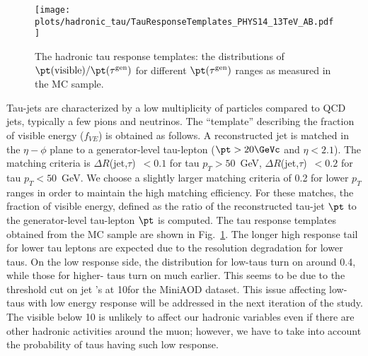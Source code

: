 
\begin{figure}[h]
  \centering
  \texttt{[image: plots/hadronic\_tau/TauResponseTemplates\_PHYS14\_13TeV\_AB.pdf]}
  \caption{The hadronic tau response templates: the distributions of $\pt(\mathrm{visible})/\pt(\tau^\mathrm{gen})$ 
    for different $\pt(\tau^\mathrm{gen})$ ranges as measured in the \ttbar MC sample.}
  \label{fig:tau_response}
\end{figure}

% 
% 
Tau-jets are characterized by a low multiplicity of particles compared to QCD jets, typically a few pions and neutrinos. 
The ``template'' describing the fraction of visible energy ($f_{VE}$) is obtained as follows.
A reconstructed jet is matched in the $\eta-\phi$ plane to a generator-level tau-lepton ($\pt>20\GeVc$ and $\eta<2.1$). 
The matching criteria is $\Delta R$(jet,$\tau$)~$<0.1$ for tau $p_{T}>50$~GeV, $\Delta R$(jet,$\tau$)~$<0.2$ for tau $p_{T}<50$~GeV.
We choose a slightly larger matching criteria of 0.2 for lower $p_{T}$ ranges in order to maintain the high matching
efficiency.
For these matches, the fraction of visible energy, defined as the ratio of the reconstructed %
tau-jet $\pt$ to the generator-level tau-lepton $\pt$ is computed.
The tau response templates obtained from the \ttbar MC sample are shown in Fig.~\ref{fig:tau_response}.
The longer high response tail for lower \pt tau leptons are expected due to the \pt resolution
degradation for lower \pt taus.
On the low response side, the distribution for low-\pt taus turn on around 0.4, while those for higher-\pt
taus turn on much earlier. This seems to be due to the threshold cut on jet \pt{}'s at 10\GeV for the MiniAOD
dataset. This issue affecting low-\pt taus with low energy response will be addressed in the next iteration of the study.
The visible \pt below 10 \GeV is unlikely to affect our hadronic variables even if there are other
hadronic activities around the muon; however, we have to take
into account the probability of taus having such low response.


